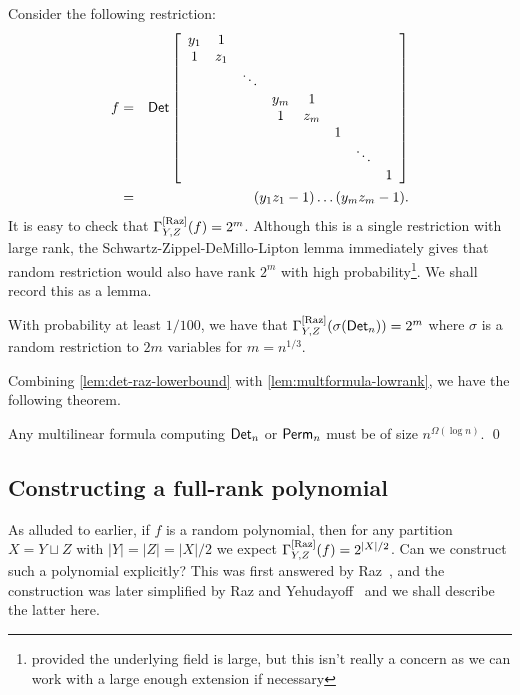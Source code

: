 Consider the following restriction:
\begin{eqnarray*}
f & = & \operatorname{\mathsf{Det}} \left[ \begin{array}{cccccccc}
y_1 & 1   &        &     &     &  &        &   \\
1   & z_1 &        &     &     &  &        &   \\
    &     & \ddots &     &     &  &        &   \\
    &     &        & y_m &1    &  &        &   \\
    &     &        & 1   &z_m  &  &        &   \\
    &     &        &     &     & 1&        &   \\
    &     &        &     &     &  & \ddots &   \\
    &     &        &     &     &  &        & 1
  \end{array}\right]\\
 &= & (y_1z_1 - 1)\dots (y_mz_m - 1).
\end{eqnarray*}
It is easy to check that $\Gamma^{\mathrm{[Raz]}}_{Y,Z}(f) = 2^m$. 
Although this is a single restriction with large rank, the Schwartz-Zippel-DeMillo-Lipton lemma immediately gives that random restriction would also have rank $2^m$ with high probability\footnote{provided the underlying field is large, but this isn't really a concern as we can work with a large enough extension if necessary}. 
We shall record this as a lemma. 

\begin{lemma}\label{lem:det-raz-lowerbound}
With probability at least $1/100$, we have that $\Gamma^{\mathrm{[Raz]}}_{Y,Z}(\sigma(\operatorname{\mathsf{Det}}_n)) = 2^m$ where $\sigma$ is a random restriction to $2m$ variables for $m = n^{1/3}$. 
\end{lemma}


Combining \autoref{lem:det-raz-lowerbound} with \autoref{lem:multformula-lowrank}, we have the following theorem. 

\begin{theorem} Any multilinear formula computing $\operatorname{\mathsf{Det}}_n$ or $\operatorname{\mathsf{Perm}}_n$ must be of size $n^{\Omega(\log n)}$. \qed
\end{theorem}

\subsection{Constructing a full-rank polynomial}\label{sec:fullrankpoly}

As alluded to earlier,  if $f$ is a random polynomial, then for any partition $X = Y \sqcup Z$ with $|Y| = |Z| = |X|/2$ we expect $\Gamma^{\mathrm{[Raz]}}_{Y,Z}(f) = 2^{|X|/2}$. 
Can we construct such a polynomial explicitly? 
This was first answered by Raz~\cite{Raz06}, and the construction was later simplified by Raz and Yehudayoff~\cite{ry08} and we shall describe the latter here. \\

